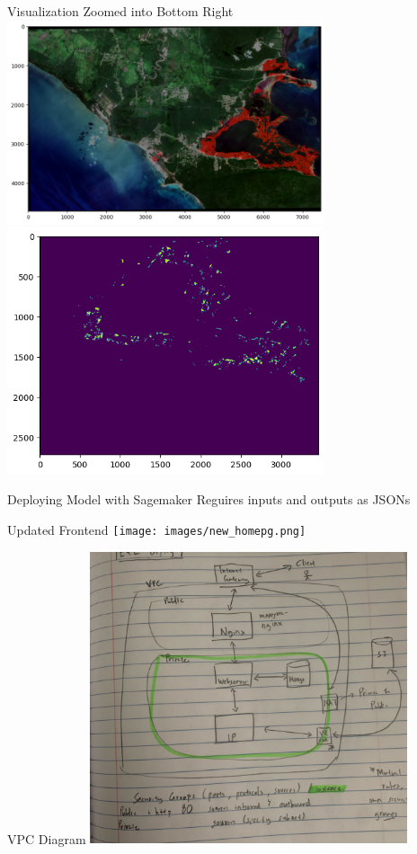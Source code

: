 \begin{frame}{Visualization Zoomed into Bottom Right}
    \centering
    \includegraphics[height=0.7\textheight,width=0.7\textwidth,keepaspectratio]{images/map.png}
    \includegraphics[height=0.7\textheight,width=0.7\textwidth,keepaspectratio]{images/maplabel.png}
\end{frame}

\begin{frame}{Deploying Model with Sagemaker}
    Reguires inputs and outputs as JSONs
\end{frame}

\begin{frame}{Updated Frontend}
    \centering
    \texttt{[image: images/new\_homepg.png]}
\end{frame}

\begin{frame}{VPC Diagram}
    \centering
    \includegraphics[height=0.7\textheight,width=0.7\textwidth,keepaspectratio]{images/IMG_4615.jpg}
\end{frame}

